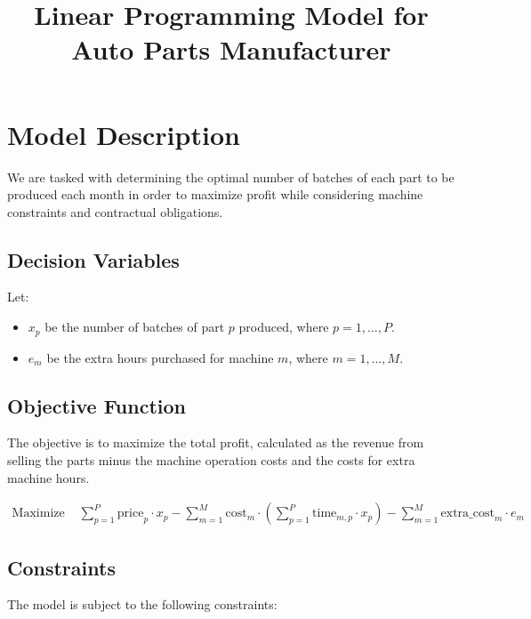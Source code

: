 \documentclass{article}
\begin{document}
\title{Linear Programming Model for Auto Parts Manufacturer}
\author{}
\date{}
\maketitle

\section*{Model Description}

We are tasked with determining the optimal number of batches of each part to be produced each month in order to maximize profit while considering machine constraints and contractual obligations.

\subsection*{Decision Variables}

Let:
\begin{itemize}
    \item \(x_p\) be the number of batches of part \(p\) produced, where \(p = 1, \ldots, P\).
    \item \(e_m\) be the extra hours purchased for machine \(m\), where \(m = 1, \ldots, M\).
\end{itemize}

\subsection*{Objective Function}

The objective is to maximize the total profit, calculated as the revenue from selling the parts minus the machine operation costs and the costs for extra machine hours.

\begin{align*}
\text{Maximize } & \sum_{p=1}^{P} \text{price}_p \cdot x_p - \sum_{m=1}^{M} \text{cost}_m \cdot \left( \sum_{p=1}^{P} \text{time}_{m,p} \cdot x_p \right) - \sum_{m=1}^{M} \text{extra\_cost}_m \cdot e_m
\end{align*}

\subsection*{Constraints}

The model is subject to the following constraints:
\end{document}
